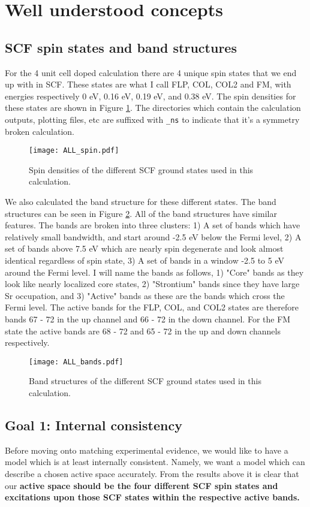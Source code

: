 \documentclass{article}
\begin{document}
\section{Well understood concepts}
\subsection{SCF spin states and band structures}
For the 4 unit cell doped calculation there are 4 unique spin states that we end up with in SCF. These states are what I call FLP, COL, COL2 and FM, with energies respectively 0 eV, 0.16 eV, 0.19 eV, and 0.38 eV. The spin densities for these states are shown in Figure \ref{fig:SpinDens}. The directories which contain the calculation outputs, plotting files, etc are suffixed with \texttt{\_ns} to indicate that it's a symmetry broken calculation. 

\begin{figure}[H]
\centering
\texttt{[image: ALL\_spin.pdf]}
\caption{Spin densities of the different SCF ground states used in this calculation.}
\label{fig:SpinDens}
\end{figure}

We also calculated the band structure for these different states. The band structures can be seen in Figure \ref{fig:Bands}. All of the band structures have similar features. The bands are broken into three clusters: 1) A set of bands which have relatively small bandwidth, and start around -2.5 eV below the Fermi level, 2) A set of bands above 7.5 eV which are nearly spin degenerate and look almost identical regardless of spin state, 3) A set of bands in a window -2.5 to 5 eV around the Fermi level. I will name the bands as follows, 1) "Core" bands as they look like nearly localized core states, 2) "Strontium" bands since they have large Sr occupation, and 3) "Active" bands as these are the bands which cross the Fermi level. The active bands for the FLP, COL, and COL2 states are therefore bands 67 - 72 in the up channel and 66 - 72 in the down channel. For the FM state the active bands are 68 - 72 and 65 - 72 in the up and down channels respectively. 

\begin{figure}[H]
\centering
\texttt{[image: ALL\_bands.pdf]}
\caption{Band structures of the different SCF ground states used in this calculation.}
\label{fig:Bands}
\end{figure}

\subsection{Goal 1: Internal consistency}
Before moving onto matching experimental evidence, we would like to have a model which is at least internally consistent. Namely, we want a model which can describe a chosen active space accurately. From the results above it is clear that our \textbf{active space should be the four different SCF spin states and excitations upon those SCF states within the respective active bands.} 
\end{document}
